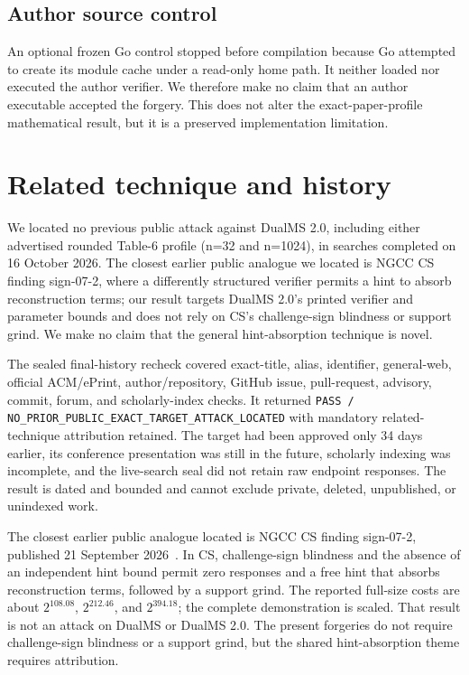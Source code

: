 \documentclass[10pt,a4paper]{article}
\begin{document}
\subsection{Author source control}

An optional frozen Go control stopped before compilation because Go attempted
to create its module cache under a read-only home path. It neither loaded nor
executed the author verifier. We therefore make no claim that an author
executable accepted the forgery. This does not alter the exact-paper-profile
mathematical result, but it is a preserved implementation limitation.

\section{Related technique and history}

We located no previous public attack against DualMS 2.0, including either advertised rounded Table-6 profile (n=32 and n=1024), in searches completed on 16 October 2026. The closest earlier public analogue we located is NGCC CS finding sign-07-2, where a differently structured verifier permits a hint to absorb reconstruction terms; our result targets DualMS 2.0's printed verifier and parameter bounds and does not rely on CS's challenge-sign blindness or support grind. We make no claim that the general hint-absorption technique is novel.

The sealed final-history recheck covered exact-title, alias, identifier,
general-web, official ACM/ePrint, author/repository, GitHub issue, pull-request,
advisory, commit, forum, and scholarly-index checks. It returned
\texttt{PASS / NO\_PRIOR\_PUBLIC\_EXACT\_TARGET\_ATTACK\_LOCATED} with mandatory
related-technique attribution retained. The target had been approved only 34
days earlier, its conference presentation was still in the future, scholarly
indexing was incomplete, and the live-search seal did not retain raw endpoint
responses. The result is dated and bounded and cannot exclude private,
deleted, unpublished, or unindexed work.

The closest earlier public analogue located is NGCC CS finding sign-07-2,
published 21 September 2026~\cite{ngcccs}. In CS, challenge-sign blindness and
the absence of an independent hint bound permit zero responses and a free hint
that absorbs reconstruction terms, followed by a support grind. The reported
full-size costs are about $2^{108.08}$, $2^{212.46}$, and $2^{394.18}$; the
complete demonstration is scaled. That result is not an attack on DualMS or
DualMS 2.0. The present forgeries do not require challenge-sign blindness or a
support grind, but the shared hint-absorption theme requires attribution.
\end{document}
